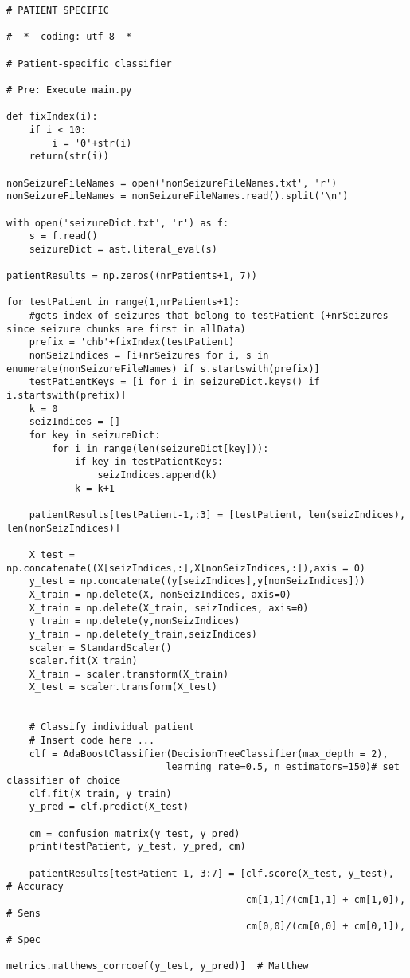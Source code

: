 \documentclass[11pt]{article}
\begin{document}
\begin{verbatim}
# PATIENT SPECIFIC

# -*- coding: utf-8 -*-

# Patient-specific classifier

# Pre: Execute main.py

def fixIndex(i):
    if i < 10:
        i = '0'+str(i)
    return(str(i))

nonSeizureFileNames = open('nonSeizureFileNames.txt', 'r')
nonSeizureFileNames = nonSeizureFileNames.read().split('\n')

with open('seizureDict.txt', 'r') as f:
    s = f.read()
    seizureDict = ast.literal_eval(s)

patientResults = np.zeros((nrPatients+1, 7))

for testPatient in range(1,nrPatients+1):
    #gets index of seizures that belong to testPatient (+nrSeizures since seizure chunks are first in allData)
    prefix = 'chb'+fixIndex(testPatient)
    nonSeizIndices = [i+nrSeizures for i, s in enumerate(nonSeizureFileNames) if s.startswith(prefix)]
    testPatientKeys = [i for i in seizureDict.keys() if i.startswith(prefix)]
    k = 0
    seizIndices = []
    for key in seizureDict:    
        for i in range(len(seizureDict[key])):
            if key in testPatientKeys:
                seizIndices.append(k)
            k = k+1

    patientResults[testPatient-1,:3] = [testPatient, len(seizIndices), len(nonSeizIndices)]
    
    X_test = np.concatenate((X[seizIndices,:],X[nonSeizIndices,:]),axis = 0)
    y_test = np.concatenate((y[seizIndices],y[nonSeizIndices]))
    X_train = np.delete(X, nonSeizIndices, axis=0)
    X_train = np.delete(X_train, seizIndices, axis=0)
    y_train = np.delete(y,nonSeizIndices)
    y_train = np.delete(y_train,seizIndices)
    scaler = StandardScaler()
    scaler.fit(X_train)
    X_train = scaler.transform(X_train)
    X_test = scaler.transform(X_test)


    # Classify individual patient
    # Insert code here ...
    clf = AdaBoostClassifier(DecisionTreeClassifier(max_depth = 2), 
                            learning_rate=0.5, n_estimators=150)# set classifier of choice
    clf.fit(X_train, y_train)
    y_pred = clf.predict(X_test)
    
    cm = confusion_matrix(y_test, y_pred)
    print(testPatient, y_test, y_pred, cm)

    patientResults[testPatient-1, 3:7] = [clf.score(X_test, y_test),                  # Accuracy
                                          cm[1,1]/(cm[1,1] + cm[1,0]),                # Sens
                                          cm[0,0]/(cm[0,0] + cm[0,1]),                # Spec
                                          metrics.matthews_corrcoef(y_test, y_pred)]  # Matthew
    

\end{verbatim}
\end{document}
